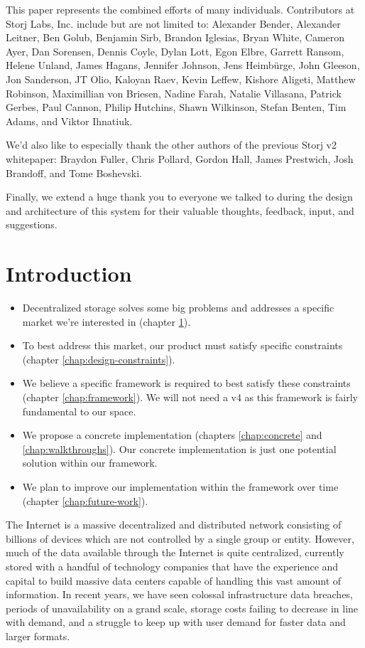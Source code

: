 \documentclass[11pt,fleqn,openany]{book}
\begin{document}
This paper represents the combined efforts of many individuals.
Contributors at Storj Labs, Inc. include but are not limited to:
Alexander Bender,
Alexander Leitner,
Ben Golub,
Benjamin Sirb,
Brandon Iglesias,
Bryan White,
Cameron Ayer,
Dan Sorensen,
Dennis Coyle,
Dylan Lott,
Egon Elbre,
Garrett Ransom,
Helene Unland,
James Hagans,
Jennifer Johnson,
Jens Heimbürge,
John Gleeson,
Jon Sanderson,
JT Olio,
Kaloyan Raev,
Kevin Leffew,
Kishore Aligeti,
Matthew Robinson,
Maximillian von Briesen,
Nadine Farah,
Natalie Villasana,
Patrick Gerbes,
Paul Cannon,
Philip Hutchins,
Shawn Wilkinson,
Stefan Benten,
Tim Adams,
and Viktor Ihnatiuk.

We'd also like to especially thank the other authors of the previous
Storj v2 whitepaper:
Braydon Fuller,
Chris Pollard,
Gordon Hall,
James Prestwich,
Josh Brandoff,
and Tome Boshevski.

Finally, we extend a huge thank you to everyone we talked to during the
design and architecture of this system for their valuable thoughts, feedback,
input, and suggestions.

\chapter{Introduction}\label{chap:intro}

\begin{itemize}
\item Decentralized storage solves some big problems and
  addresses a specific market we're interested in (chapter \ref{chap:intro}).
\item To best address this market, our product must satisfy specific constraints
  (chapter \ref{chap:design-constraints}).
\item We believe a specific framework is required to best satisfy these
  constraints (chapter \ref{chap:framework}).
  We will not need a v4 as this framework is fairly fundamental to our space.
\item We propose a concrete implementation (chapters \ref{chap:concrete} and
  \ref{chap:walkthroughs}).
  Our concrete implementation is just one potential solution within our
  framework.
\item We plan to improve our implementation within the framework over time
  (chapter \ref{chap:future-work}).
\end{itemize}

The Internet is a massive decentralized and distributed network consisting of
billions of devices which are not controlled by a single group or entity.
However, much of the data available through the Internet is quite centralized,
currently stored with a handful of technology companies that have the
experience and capital to build massive data centers capable of handling this
vast amount of information.
In recent years, we have seen colossal infrastructure data breaches, periods of
unavailability on a grand scale, storage costs failing to decrease in line with
demand, and a struggle to keep up with user demand for faster data and larger
formats.
\end{document}
